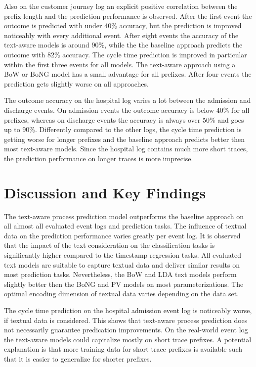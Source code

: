 Also on the customer journey log an explicit positive correlation between the prefix length and the prediction performance is observed.
After the first event the outcome is predicted with under 40\% accuracy, but the prediction is improved noticeably with every additional event.
After eight events the accuracy of the text-aware models is around 90\%, while the the baseline approach predicts the outcome with 82\% accuracy.
The cycle time prediction is improved in particular within the first three events for all models.
The text-aware approach using a BoW or BoNG model has a small advantage for all prefixes.
After four events the prediction gets slightly worse on all approaches.

The outcome accuracy on the hospital log varies a lot between the admission and discharge events.
On admission events the outcome accuracy is below 40\% for all prefixes, whereas on discharge events the accuracy is always over 50\% and goes up to 90\%.
Differently compared to the other logs, the cycle time prediction is getting worse for longer prefixes and the baseline approach predicts better then most text-aware models.
Since the hospital log contains much more short traces, the prediction performance on longer traces is more imprecise.
 


\section{Discussion and Key Findings}

The text-aware process prediction model outperforms the baseline approach on all almost all evaluated event logs and prediction tasks.
The influence of textual data on the prediction performance varies greatly per event log.
It is observed that the impact of the text consideration on the classification tasks is significantly higher compared to the timestamp regression tasks.
All evaluated text models are suitable to capture textual data and deliver similar results on most prediction tasks.
Nevertheless, the BoW and LDA text models perform slightly better then the BoNG and PV models on most parameterizations.
The optimal encoding dimension of textual data varies depending on the data set.

The cycle time prediction on the hospital admission event log is noticeably worse, if textual data is considered.
This shows that text-aware process prediction does not necessarily guarantee predication improvements.
On the real-world event log the text-aware models could capitalize mostly on short trace prefixes.
A potential explanation is that more training data for short trace prefixes is available such that it is easier to generalize for shorter prefixes.